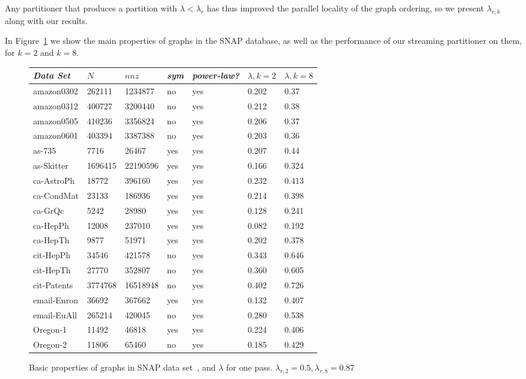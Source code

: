 \documentclass[11pt]{article}
\begin{document}
Any partitioner that produces a partition with $\lambda < \lambda_r$ has thus improved the parallel locality of the graph ordering, so we present $\lambda_{r,k}$ along with our results.

In Figure~\ref{table:big} we show the main properties of graphs in the SNAP database, as well as the performance of our streaming partitioner on them, for $k=2$ and $k=8$. 

\begin{figure}
\caption{Basic properties of graphs in SNAP data set~\cite{Leskovec-data}, and $\lambda$ for one pass. $\lambda_{r,2}=0.5,\lambda_{r,8}=0.87$}
\centering
{ \begin{tabular}{ *7l }    \toprule
\label{table:big}
\emph{Data Set} & $N$ & $nnz$ & \emph{sym} & \emph{power-law?} & $\lambda, k=2$ & $\lambda, k=8$ \\\midrule 
amazon0302 & 262111 & 1234877 & no & yes & 0.202&0.37\\ 
amazon0312 & 400727 & 3200440 & no & yes & 0.212&0.38\\ 
amazon0505 & 410236 & 3356824 & no & yes & 0.206&0.37\\ 
amazon0601 & 403394 & 3387388 & no & yes & 0.203&0.36\\ 
as-735 & 7716 & 26467 & yes & yes & 0.207&0.44\\ 
as-Skitter & 1696415 & 22190596 & yes & yes & 0.166&0.324\\ 
ca-AstroPh & 18772 & 396160 & yes & yes & 0.232&0.413\\ 
ca-CondMat & 23133 & 186936 & yes & yes & 0.214&0.398\\ 
ca-GrQc & 5242 & 28980 & yes & yes & 0.128&0.241\\ 
ca-HepPh & 12008 & 237010 & yes & yes & 0.082&0.192\\ 
ca-HepTh & 9877 & 51971 & yes & yes & 0.202&0.378\\ 
cit-HepPh & 34546 & 421578 & no & yes & 0.343&0.646\\ 
cit-HepTh & 27770 & 352807 & no & yes & 0.360&0.605\\ 
cit-Patents & 3774768 & 16518948 & no & yes & 0.402&0.726\\ 
email-Enron & 36692 & 367662 & yes & yes & 0.132&0.407\\ 
email-EuAll & 265214 & 420045 & no & yes & 0.280&0.538\\ 
Oregon-1 & 11492 & 46818 & yes & yes & 0.224&0.406\\ 
Oregon-2 & 11806 & 65460 & no & yes & 0.185&0.429\\ 

\end{tabular}}
\end{figure}
\end{document}
